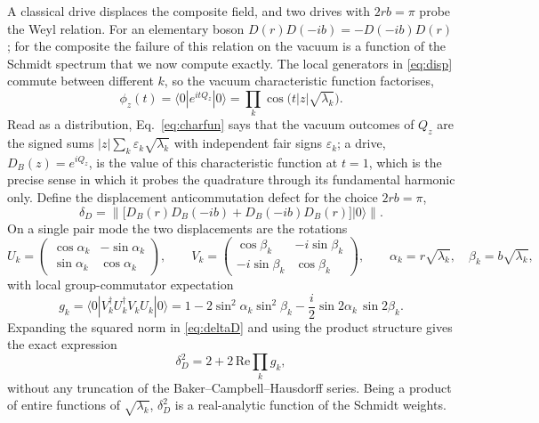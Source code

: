 \documentclass[11pt,a4paper]{article}
\newcommand{\ket}[1]{|#1\rangle}
\newcommand{\bra}[1]{\langle#1|}
\begin{document}
A classical drive displaces the composite field, and two drives with $2rb=\pi$ probe the Weyl relation. For an elementary boson $D(r)D(-ib)=-D(-ib)D(r)$; for the composite the failure of this relation on the vacuum is a function of the Schmidt spectrum that we now compute exactly. The local generators in \eqref{eq:disp} commute between different $k$, so the vacuum characteristic function factorises,
\begin{equation}
\phi_z(t)=\bra{0}e^{itQ_z}\ket{0}=\prod_k\cos\big(t|z|\sqrt{\lambda_k}\big).
\label{eq:charfun}
\end{equation}
Read as a distribution, Eq.~\eqref{eq:charfun} says that the vacuum outcomes of $Q_z$ are the signed sums $|z|\sum_k\varepsilon_k\sqrt{\lambda_k}$ with independent fair signs $\varepsilon_k$; a drive, $D_B(z)=e^{iQ_z}$, is the value of this characteristic function at $t=1$, which is the precise sense in which it probes the quadrature through its fundamental harmonic only. Define the displacement anticommutation defect for the choice $2rb=\pi$,
\begin{equation}
\delta_D=\big\|\big[D_B(r)D_B(-ib)+D_B(-ib)D_B(r)\big]\ket{0}\big\|.
\label{eq:deltaD}
\end{equation}
On a single pair mode the two displacements are the rotations
\begin{equation}
U_k=\begin{pmatrix}\cos\alpha_k&-\sin\alpha_k\\ \sin\alpha_k&\cos\alpha_k\end{pmatrix},\qquad
V_k=\begin{pmatrix}\cos\beta_k&-i\sin\beta_k\\ -i\sin\beta_k&\cos\beta_k\end{pmatrix},\qquad
\alpha_k=r\sqrt{\lambda_k},\quad\beta_k=b\sqrt{\lambda_k},
\end{equation}
with local group-commutator expectation
\begin{equation}
g_k=\bra{0}V_k^\dagger U_k^\dagger V_kU_k\ket{0}=1-2\sin^2\alpha_k\sin^2\beta_k-\frac{i}{2}\sin 2\alpha_k\,\sin 2\beta_k .
\label{eq:gk}
\end{equation}
Expanding the squared norm in \eqref{eq:deltaD} and using the product structure gives the exact expression
\begin{equation}
\delta_D^2=2+2\,\mathrm{Re}\prod_k g_k ,
\label{eq:product}
\end{equation}
without any truncation of the Baker--Campbell--Hausdorff series. Being a product of entire functions of $\sqrt{\lambda_k}$, $\delta_D^2$ is a real-analytic function of the Schmidt weights.
\end{document}
